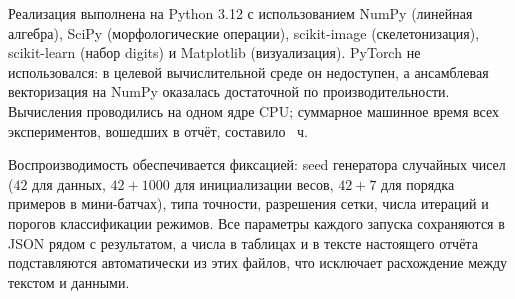 Реализация выполнена на Python 3.12 с использованием NumPy (линейная алгебра),
SciPy (морфологические операции), scikit-image (скелетонизация),
scikit-learn (набор digits) и Matplotlib (визуализация). PyTorch не
использовался: в целевой вычислительной среде он недоступен, а ансамблевая
векторизация на NumPy оказалась достаточной по производительности.
Вычисления проводились на одном ядре CPU; суммарное машинное время всех
экспериментов, вошедших в отчёт, составило \TotalHours~ч.

Воспроизводимость обеспечивается фиксацией: seed генератора случайных чисел
($42$ для данных, $42+1000$ для инициализации весов, $42+7$ для порядка
примеров в мини-батчах), типа точности, разрешения сетки, числа итераций и
порогов классификации режимов. Все параметры каждого запуска сохраняются в
JSON рядом с результатом, а числа в таблицах и в тексте настоящего отчёта
подставляются автоматически из этих файлов, что исключает расхождение между
текстом и данными.
